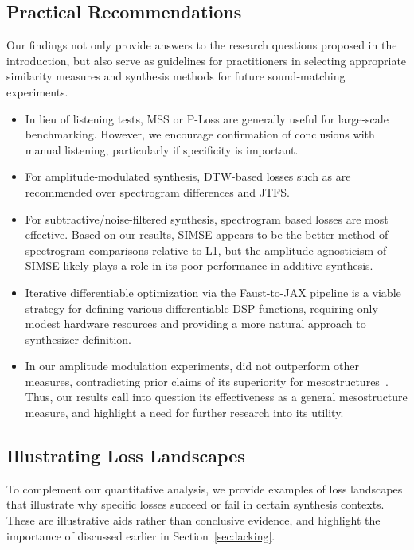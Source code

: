 \subsection{Practical Recommendations}
    Our findings not only provide answers to the research questions proposed in the introduction, but also serve as guidelines for practitioners in selecting appropriate similarity measures and synthesis methods for future sound-matching experiments.
\begin{itemize}
    \item In lieu of listening tests, MSS or P-Loss are generally useful for large-scale benchmarking. However, we encourage confirmation of conclusions with manual listening, particularly if specificity is important. 
    \item For amplitude-modulated synthesis, DTW-based losses such as \DTWEnv{} are recommended over spectrogram differences and JTFS.
    \item  For subtractive/noise-filtered synthesis, spectrogram based losses are most effective. Based on our results, SIMSE appears to be the better method of spectrogram comparisons relative to L1, but the amplitude agnosticism of SIMSE likely plays a role in its poor performance in additive synthesis.  
    \item Iterative differentiable optimization via the Faust-to-JAX pipeline is a viable strategy for defining various differentiable DSP functions, requiring only modest hardware resources and providing a more natural approach to synthesizer definition.
    \item In our amplitude modulation experiments, \JTFS{} did not outperform other measures, contradicting prior claims of its superiority for mesostructures~\cite{vahidi2023mesostructures}. Thus, our results call into question its effectiveness as a general mesostructure measure, and highlight a need for further research into its utility.
\end{itemize}

\subsection{Illustrating Loss Landscapes}
\label{sec:loss_landscape_examples}
To complement our quantitative analysis, we provide examples of loss landscapes that illustrate why specific losses succeed or fail in certain synthesis contexts. These are illustrative aids rather than conclusive evidence, and highlight the importance of \PeriodicLoss{} discussed earlier in Section~\ref{sec:lacking}.

